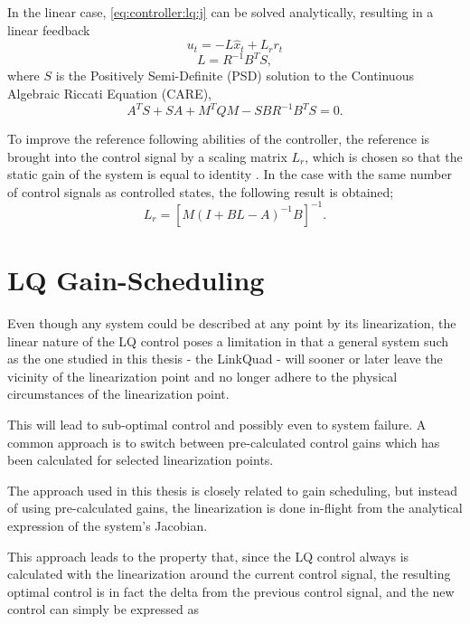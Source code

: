         In the linear case, \eqref{eq:controller:lq:j} can be solved analytically,
        resulting in a linear feedback
        \begin{equation}
            u_{t} = -L\hat{x}_{t} + L_{r}r_{t}
        \end{equation}
        \begin{equation}
            L = R^{-1}B^{T}S,
        \end{equation}
        where $S$ is the Positively Semi-Definite (PSD) solution to the
        Continuous Algebraic Riccati Equation (CARE)\citep{glad2003reglerteori},
        \begin{equation}
            A^{T}S + SA + M^{T}QM - SBR^{-1}B^{T}S = 0.
        \end{equation}

        To improve the reference following abilities of the controller,
        the reference is brought into the control signal by a scaling
        matrix $L_{r}$, which is chosen so that the static gain of the
        system is equal to identity \citep{glad2003reglerteori}.
        In the case with the same number of control signals as controlled
        states, the following result is obtained;
        \begin{equation}
            L_{r} = \left[M(I + BL - A)^{-1}B\right]^{-1}.
        \end{equation}

    \section{LQ Gain-Scheduling}
        Even though any system could be described at any point by its linearization,
        the linear nature of the LQ control poses a limitation in that
        a general system such as the one studied in this thesis - the LinkQuad - will
        sooner or later leave the vicinity of the linearization point and no
        longer adhere to the physical circumstances of the linearization point.

        This will lead to sub-optimal control and possibly even to system failure.
        A common approach is to switch between pre-calculated control gains
        which has been calculated for selected linearization points.

        The approach used in this thesis is closely related to gain scheduling,
        but instead of using pre-calculated gains, the linearization is done
        in-flight from the analytical expression of the system's Jacobian.

        This approach leads to the property that, since the LQ control
        always is calculated with the linearization around the current control signal,
        the resulting optimal control is in fact the delta from the previous control signal,
        and the new control can simply be expressed as

